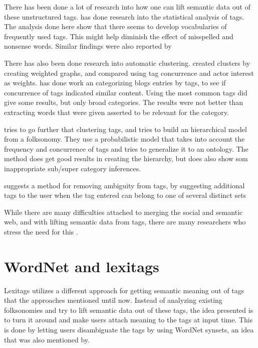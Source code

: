 There has been done a lot of research into how one can lift semantic data out of these unstructured tags.
\citet{Golder2005} has done research into the statistical analysis of tags. 
The analysis done here show that there seems to develop vocabularies of frequently used tags. 
This might help diminish the effect of misspelled and nonsense words. Similar findings were also reported by \citep{Shirky2007}

There has also been done research into automatic clustering. 
\citet{Mika2005} created clusters by creating weighted graphs, and compared using tag concurrence and actor interest as weights.  
\citet{Brooks2006} has done work an categorizing blogs entries by tags, to see if concurrence of tags indicated similar content. 
Using the most common tags did give some results, but only broad categories. The results were not better than extracting words that were given asserted to be relevant for the category.

\citep{Tang2009} tries to go further that clustering tags, and tries to build an hierarchical model from a folksonomy. 
They use a probabilistic model that takes into account the frequency and concurrence of tags and tries to generalize it to an ontology. 
The method does get good results in creating the hierarchy, but does also show som inappropriate sub/super category inferences.

\citet{Weinberger2008} suggests a method for removing ambiguity from tags,
 by suggesting additional tags to the user when the tag entered can belong to one of several distinct sets 

While there are many difficulties attached to merging the social and semantic web, and with lifting semantic data from tags, there are many researchers who stress the need for this \citep{Passant2007,Mika2005, Gruber2007}.

\section{WordNet and lexitags}
\label{TheoryWordNet}
Lexitags \citep{Veres2011} utilizes a different approach for getting semantic meaning out of tags that the approaches mentioned until now. 
Instead of analyzing existing folksonomies and try to lift semantic data out of these tags, the idea presented is to turn it around and make users attach meaning to the tags at input time.
This is done by letting users disambiguate the tags by using WordNet synsets, an idea that was also mentioned by.

